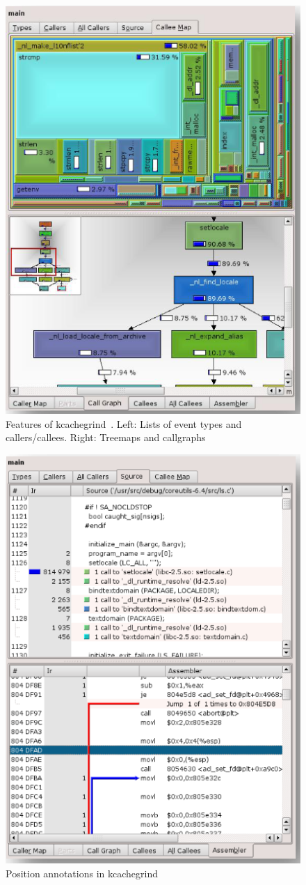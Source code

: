 \begin{figure}[ht]
\begin{minipage}{0.5\textwidth}
        \includegraphics[width=\textwidth]{figures/kcachegrind_callgraph.png}
    \end{minipage}
    \caption{Features of kcachegrind~\cite{kcachegrind}. Left: Lists of event types and callers/callees. Right: Treemaps and callgraphs}
    \label{fig:kcachegrind_1}
\end{figure}

\begin{figure}[ht]
    \centering
    \includegraphics[width=0.5\linewidth]{figures/kcachegrind_pos_annotation.png}
    \caption{Position annotations in kcachegrind~\cite{kcachegrind}}
    \label{fig:kcachegrind_pos_annotations}
\end{figure}